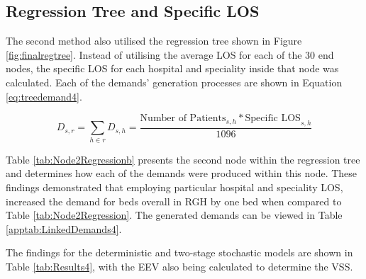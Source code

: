 \documentclass[../thesis.tex]{subfiles}
\begin{document}
\subsection{Regression Tree and Specific LOS}
The second method also utilised the regression tree shown in Figure \ref{fig:finalregtree}. Instead of utilising the average LOS for each of the 30 end nodes, the specific LOS for each hospital and speciality inside that node was calculated. Each of the demands' generation processes are shown in Equation \eqref{eq:treedemand4}.

\begin{equation}\label{eq:treedemand4}
        D_{s,r} = \sum\limits_{h \in r} D_{s,h} = \frac{\text{Number of Patients}_{s,h}*{\text{Specific LOS}_{s,h}}}{1096}
\end{equation}

Table \ref{tab:Node2Regressionb} presents the second node within the regression tree and determines how each of the demands were produced within this node. These findings demonstrated that employing particular hospital and speciality LOS, increased the demand for beds overall in RGH by one bed when compared to Table \ref{tab:Node2Regression}. The generated demands can be viewed in Table \ref{apptab:LinkedDemands4}.

\begin{table}[h!]
    \centering{}
    \caption{Regression Tree Node Two - Specific LOS}
    \label{tab:Node2Regressionb}
\end{table}

The findings for the deterministic and two-stage stochastic models are shown in Table \ref{tab:Results4}, with the EEV also being calculated to determine the VSS.
\end{document}
